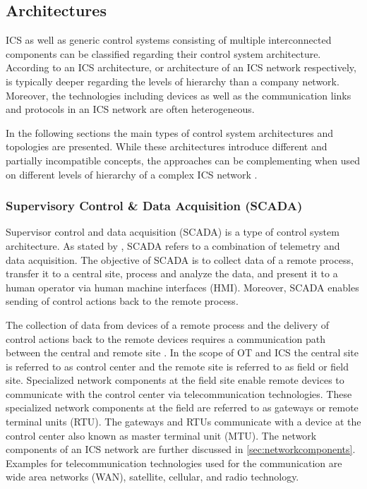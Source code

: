 \subsection{Architectures}
\label{sec:architectures}
ICS as well as generic control systems consisting of multiple interconnected components can be classified regarding their control system architecture.
According to \citeauthor{Galloway2013} \cite{Galloway2013} an ICS architecture, or architecture of an ICS network respectively, is typically deeper regarding the levels of hierarchy than a company network.
Moreover, the technologies including devices as well as the communication links and protocols in an ICS network are often heterogeneous.

In the following sections the main types of control system architectures and topologies are presented.
While these architectures introduce different and partially incompatible concepts, the approaches can be complementing when used on different levels of hierarchy of a complex ICS network \cite{Stouffer2023}.

\subsubsection{Supervisory Control \& Data Acquisition (SCADA)}
Supervisor control and data acquisition (SCADA) is a type of control system architecture.
As stated by \citeauthor{bailey2003} \cite{bailey2003}, SCADA refers to a combination of telemetry and data acquisition.
The objective of SCADA is to collect data of a remote process, transfer it to a central site, process and analyze the data, and present it to a human operator via human machine interfaces (HMI).
Moreover, SCADA enables sending of control actions back to the remote process.

The collection of data from devices of a remote process and the delivery of control actions back to the remote devices requires a communication path between the central and remote site \cite{Stouffer2023}.
In the scope of OT and ICS the central site is referred to as control center and the remote site is referred to as field or field site.
Specialized network components at the field site enable remote devices to communicate with the control center via telecommunication technologies.
These specialized network components at the field are referred to as gateways or remote terminal units (RTU).
The gateways and RTUs communicate with a device at the control center also known as master terminal unit (MTU).
The network components of an ICS network are further discussed in \autoref{sec:networkcomponents}.
Examples for telecommunication technologies used for the communication are wide area networks (WAN), satellite, cellular, and radio technology.


